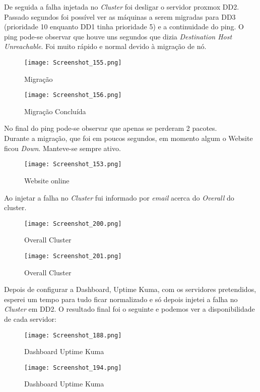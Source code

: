 De seguida a falha injetada no \textit{Cluster} foi desligar o servidor proxmox DD2.
Passado segundos foi possível ver as máquinas a serem migradas para DD3 (prioridade 10 enquanto DD1 tinha prioridade 5) e a continuidade do ping. O ping pode-se observar que houve uns segundos que dizia \textit{Destination Host Unreachable}. Foi muito rápido e normal devido à migração de nó.

\begin{figure}[H]
\center
\texttt{[image: Screenshot\_155.png]}
\caption{Migração}
\end{figure}

\newpage
\begin{figure}[H]
\center
\texttt{[image: Screenshot\_156.png]}
\caption{Migração Concluída}
\end{figure}

No final do ping pode-se observar que apenas se perderam 2 pacotes.\\

Durante a migração, que foi em poucos segundos, em momento algum o Website ficou \textit{Down}. Manteve-se sempre ativo.

\begin{figure}[H]
\center
\texttt{[image: Screenshot\_153.png]}
\caption{Website online}
\end{figure}

\newpage
Ao injetar a falha no \textit{Cluster} fui informado por \textit{email} acerca do \textit{Overall} do cluster.

\begin{figure}[H]
\center
\texttt{[image: Screenshot\_200.png]}
\caption{Overall Cluster}
\end{figure}

\begin{figure}[H]
\center
\texttt{[image: Screenshot\_201.png]}
\caption{Overall Cluster}
\end{figure}

Depois de configurar a Dashboard, Uptime Kuma, com os servidores pretendidos, esperei um tempo para tudo ficar normalizado e só depois injetei a falha no \textit{Cluster} em DD2. O resultado final foi o seguinte e podemos ver a disponibilidade de cada servidor:

\begin{figure}[H]
\center
\texttt{[image: Screenshot\_188.png]}
\caption{Dashboard Uptime Kuma}
\end{figure}

\begin{figure}[H]
\center
\texttt{[image: Screenshot\_194.png]}
\caption{Dashboard Uptime Kuma}
\end{figure}